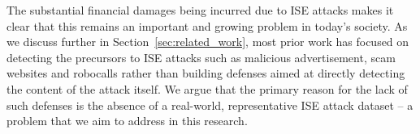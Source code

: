 




The substantial financial damages being incurred due to ISE attacks makes it clear that this remains an important and growing problem in today's society. As we discuss further in Section~\ref{sec:related_work}, most prior work has focused on detecting the precursors to ISE attacks such as malicious advertisement, scam websites and robocalls rather than building defenses aimed at directly detecting the content of the attack itself. We argue that the primary reason for the lack of such defenses is the absence of a real-world, representative ISE attack dataset -- a problem that we aim to address in this research. 

